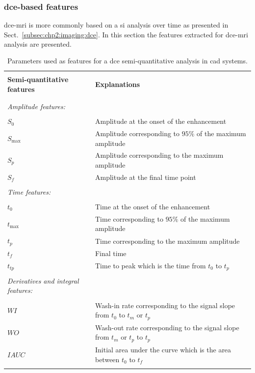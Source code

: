 \subsubsection{\Ac{dce}-based features}\label{subsubsec:chp3:img-clas:CADX-fea-dec:DCE-fea}

\ac{dce}-\ac{mri} is more commonly based on a \ac{si} analysis over time as presented in Sect.~\ref{subsec:chp2:imaging:dce}.
In this section the features extracted for \ac{dce}-\ac{mri} analysis are presented.

\begin{table}
  \caption{Parameters used as features for a \ac{dce} semi-quantitative analysis in \ac{cad} systems.}
  \small
  \renewcommand{\arraystretch}{.8}
  \begin{tabular}{p{.35\linewidth} p{.60\linewidth}}
    \hline \\ [-1.5ex]
    \textbf{Semi-quantitative features} & \textbf{Explanations} \\ \\ [-1.5ex]
    \hline \\ [-1.5ex]
    \textit{Amplitude features:} & \\ \\ [-1.5ex]
    \quad $S_0$ & Amplitude at the onset of the enhancement \\
    \quad $S_{\max}$ & Amplitude corresponding to $95\%$ of the maximum amplitude \\
    \quad $S_{p}$ & Amplitude corresponding to the maximum amplitude \\
    \quad $S_f$ & Amplitude at the final time point \\ \\ [-1.5ex]
    \textit{Time features:} & \\ \\ [-1.5ex]
    \quad $t_0$ & Time at the onset of the enhancement \\
    \quad $t_{\max}$ & Time corresponding to $95\%$ of the maximum amplitude \\
    \quad $t_{p}$ & Time corresponding to the maximum amplitude \\
    \quad $t_{f}$ & Final time \\
    \quad $t_{tp}$ & Time to peak which is the time from $t_0$ to $t_p$ \\ \\ [-1.5ex]
    \textit{Derivatives and integral features:} & \\ \\ [-1.5ex]
    \quad $WI$ & Wash-in rate corresponding to the signal slope from $t_0$ to $t_m$ or $t_p$ \\
    \quad $WO$ & Wash-out rate corresponding to the signal slope from $t_m$ or $t_p$ to $t_p$ \\
    \quad $IAUC$ & Initial area under the curve which is the area between $t_0$ to $t_{f}$ \\ \\ [-1.5ex]
    \hline
  \end{tabular}
\label{tab:semiqua}
\end{table}



